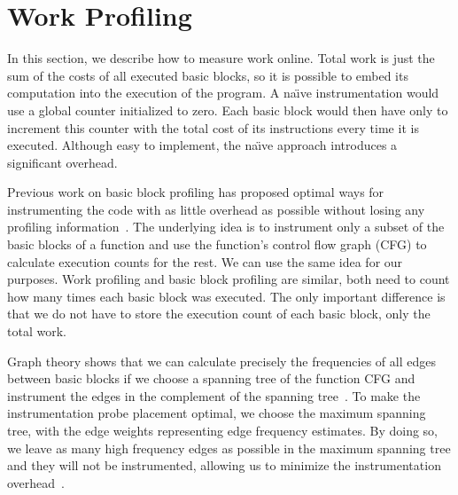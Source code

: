 \section{Work Profiling}\label{sec:prof}

In this section, we describe how to measure work online. Total work is just the sum of the costs of all executed basic blocks, so it is
possible to embed its computation into the execution of the program. A na\"{\i}ve instrumentation would use a global counter initialized
to zero. Each basic block would then have only to increment this counter with the total cost of its
instructions every time it is executed. Although easy to implement, the na\"{\i}ve approach introduces a significant overhead.

Previous work on basic block profiling has proposed optimal ways for instrumenting the code with as little overhead as possible without
losing any profiling information~\citep{knuth73,ball94}. The underlying idea is to instrument only a subset of the basic blocks of a
function and use the function's control flow graph (CFG) to calculate execution counts for the rest. We can use the same idea for our
purposes. Work profiling and basic block profiling are similar, both need to count how many times each basic block was executed. The only
important difference is that we do not have to store the execution count of each basic block, only the total work.

Graph theory shows that we can calculate precisely the frequencies of all edges between basic blocks if we choose a spanning tree of the
function CFG and instrument the edges in the complement of the spanning tree~\cite{nahapetian73,forman81}.
To make the instrumentation probe placement optimal, we choose the maximum spanning tree,
with the edge weights representing edge frequency estimates. By doing so, we leave as many high frequency edges as possible in the
maximum spanning tree and they will not be instrumented, allowing us to minimize the instrumentation overhead~\cite{forman81,ball94}.

